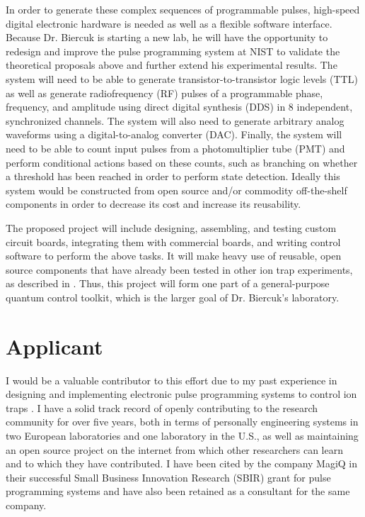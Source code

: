 \documentclass{article}
\begin{document}
In order to generate these complex sequences of programmable pulses,
high-speed digital electronic hardware is needed as well as a flexible software
interface. Because Dr. Biercuk is starting a new lab, he will have the
opportunity to redesign and improve the pulse programming system at NIST
to validate the theoretical proposals above and further extend his
experimental results. The system will need to be able to generate
transistor-to-transistor logic levels (TTL) as well as generate radiofrequency
(RF) pulses of a programmable phase, frequency, and amplitude using
direct digital synthesis (DDS) in 8 independent, synchronized channels.
The system will also need to generate arbitrary analog waveforms using
a digital-to-analog converter (DAC).
Finally, the system will need to be able to count input pulses from a
photomultiplier tube (PMT) and perform conditional actions based on these
counts, such as branching on whether a threshold has been reached in order to
perform state detection. Ideally this system would be constructed from
open source and/or commodity off-the-shelf components in order to decrease
its cost and increase its reusability.

The proposed project will include designing, assembling, and testing
custom circuit boards, integrating them with commercial boards, and
writing control software to perform the above tasks. It will make heavy
use of reusable, open source components that have already been tested in other
ion trap experiments, as described in \cite{pp2005}.
Thus, this project will form one part of a general-purpose quantum control toolkit,
which is the larger goal of Dr. Biercuk's laboratory.

\section{Applicant}

I would be a valuable contributor to this effort due to my past experience in
designing and implementing electronic pulse programming systems to control
ion traps \cite{Pham2005} \cite{Petersen2007} \cite{Schindler2008}.
I have a solid track record of openly contributing
to the research community for over five years, both in terms of personally
engineering systems in two European laboratories \cite{Riebe2006}
 and one laboratory in the U.S.,
as well as maintaining an open source project on the internet
\cite{pp2005}
from which other
researchers can learn and to which they have contributed. I have
been cited by the company MagiQ in their successful
Small Business Innovation Research (SBIR)
grant for pulse programming systems \cite{MagiQ2007}
and have also been retained as a consultant for the same company.
\end{document}
